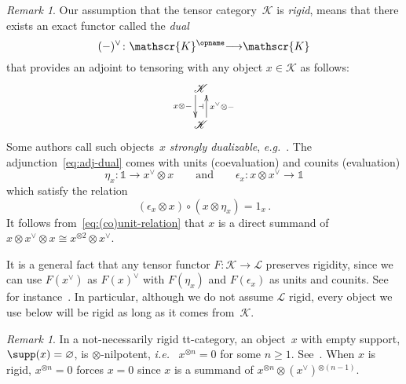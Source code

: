 \documentclass{amsart}
\numberwithin{equation}{section}
\theoremstyle{remark}
\newtheorem{Rem}[equation]{Remark}
\begin{document}
\begin{Rem}
\label{rem:rigid}Our assumption that the tensor category~${\mathscr{{K}}}$ is \emph{rigid}, means that there exists an exact functor called the \emph{dual}
\[
(-)^\vee\colon {\mathscr{{K}}}{^{\opname}} {\mathop{\longrightarrow}\limits} {\mathscr{{K}}}
\]
that provides an adjoint to tensoring with any object $x\in {\mathscr{{K}}}$ as follows:
\begin{equation}
\label{eq:adj-dual}
\vcenter{\xymatrix@R=2em{
{\mathscr{{K}}} \ar@<-.5em>[d]_-{x\otimes-} \ar@{}[d]|-{\dashv}
\\
{\mathscr{{K}}} \ar@<-.5em>[u]_-{x^\vee\otimes-}
}}
\end{equation}
Some authors call such objects~$x$ \emph{strongly dualizable}, {{\sl e.g.}}~\cite{HoveyPalmieriStrickland97}. The adjunction~\eqref{eq:adj-dual} comes with units (coevaluation) and counits (evaluation)
\begin{equation}
\label{eq:(co)units}\eta_x\colon{\mathbb{1}}\to x^\vee\otimes x
{\qquad\textrm{{and}}\qquad}
{\epsilon}_x\colon x\otimes x^\vee\to {\mathbb{1}}
\end{equation}
which satisfy the relation
\begin{equation}
\label{eq:(co)unit-relation}({\epsilon}_x\otimes x)\circ (x\otimes \eta_x)=1_x\,.
\end{equation}
It follows from~\eqref{eq:(co)unit-relation} that $x$ is a direct summand of $x\otimes x^\vee \otimes x\cong x{^{\otimes {2}}}\otimes x^\vee$.

It is a general fact that any tensor functor $F\colon{\mathscr{{K}}}\to {\mathscr{{L}}}$ preserves rigidity, since we can use $F(x^\vee)$ as $F(x)^\vee$ with $F(\eta_x)$ and $F({\epsilon}_x)$ as units and counits. See for instance~\cite[Prop.\,3.1]{FauskHuMay03}. In particular, although we do not assume ${\mathscr{{L}}}$ rigid, every object we use below will be rigid as long as it comes from~${\mathscr{{K}}}$.
\end{Rem}

\begin{Rem}
\label{rem:non-rigid}In a not-necessarily rigid tt-category, an object~$x$ with empty support, $\supp(x)=\varnothing$, is {$\otimes$-nilpotent}, {{\sl i.e.}\ } $x{^{\otimes {n}}}=0$ for some $n\ge 1$. See~\cite[Cor.\,2.4]{Balmer05a}. When $x$ is rigid, $x{^{\otimes {n}}}=0$ forces $x=0$ since $x$ is a summand of $x{^{\otimes {n}}}\otimes (x^\vee){^{\otimes {(n-1)}}}$.
\end{Rem}

\smallbreak
\end{document}
